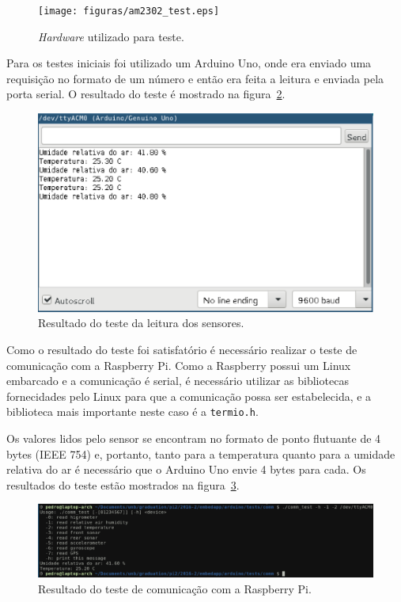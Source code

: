 		\begin{figure}[!htbp]
		\begin{center}
		\texttt{[image: figuras/am2302\_test.eps]}
		\caption{\label{fig:am2302test}\textit{Hardware} utilizado para teste.}
		\end{center}
		\end{figure}

		Para os testes iniciais foi utilizado um Arduino Uno, onde era enviado uma requisição
		no formato de um número e então era feita a leitura e enviada pela porta serial.
		O resultado do teste é mostrado na figura~\ref{fig:am2302ardu}.

		\begin{figure}[!htbp]
		\begin{center}
		\includegraphics[width=.7\textwidth]{figuras/am2302_arduino.eps}
		\caption{\label{fig:am2302ardu}Resultado do teste da leitura dos sensores.}
		\end{center}
		\end{figure}

		Como o resultado do teste foi satisfatório é necessário realizar
		o teste de comunicação com a Raspberry Pi. Como a Raspberry possui
		um Linux embarcado e a comunicação é serial, é necessário utilizar
		as bibliotecas fornecidades pelo Linux para que a comunicação
		possa ser estabelecida, e a biblioteca mais importante neste caso
		é a \texttt{termio.h}.
		
		Os valores lidos pelo sensor se encontram no formato de ponto flutuante
		de 4 bytes (IEEE 754) e, portanto, tanto para a temperatura quanto
		para a umidade relativa do ar é necessário que o Arduino Uno envie
		4 bytes para cada. Os resultados do teste estão mostrados na figura~\ref{fig:am2302rasp}.

		\begin{figure}[!htbp]
		\begin{center}
		\includegraphics[width=\textwidth]{figuras/am2302_raspberry.eps}
		\caption{\label{fig:am2302rasp}Resultado do teste de comunicação com a Raspberry Pi.}
		\end{center}
		\end{figure}

